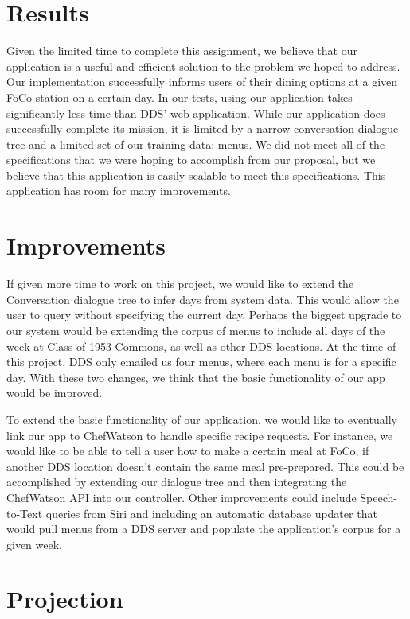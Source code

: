 \documentclass [12pt] {article}
\begin{document}
 \section{Results}
 
 Given the limited time to complete this assignment, we believe that our application is a useful and efficient solution to the problem we hoped to address. Our implementation successfully informs users of their dining options at a given FoCo station on a certain day. In our tests, using our application takes significantly less time than DDS' web application. While our application does successfully complete its mission, it is limited by a narrow conversation dialogue tree and a limited set of our training data: menus. We did not meet all of the specifications that we were hoping to accomplish from our proposal, but we believe that this application is easily scalable to meet this specifications. This application has room for many improvements. 
 
 \section{Improvements}
 
 If given more time to work on this project, we would like to extend the Conversation dialogue tree to infer days from system data. This would allow the user to query without specifying the current day. Perhaps the biggest upgrade to our system would be extending the corpus of menus to include all days of the week at Class of 1953 Commons, as well as other DDS locations. At the time of this project, DDS only emailed us four menus, where each menu is for a specific day. With these two changes, we think that the basic functionality of our app would be improved.
 
 To extend the basic functionality of our application, we would like to eventually link our app to ChefWatson to handle specific recipe requests. For instance, we would like to be able to tell a user how to make a certain meal at FoCo, if another DDS location doesn't contain the same meal pre-prepared. This could be accomplished by extending our dialogue tree and then integrating the ChefWatson API into our controller. Other improvements could include Speech-to-Text queries from Siri and including an automatic database updater that would pull menus from a DDS server and populate the application's corpus for a given week.
 
\section{Projection}
\end{document}
